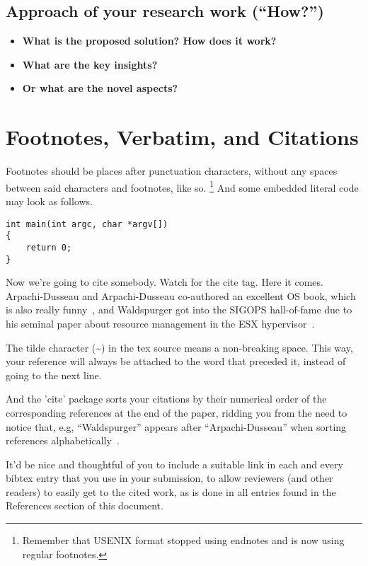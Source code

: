\subsection{Approach of your research work (``How?'')}
\begin{itemize}
  \item \textbf{What is the proposed solution? How does it work?}
  \item \textbf{What are the key insights?}
  \item \textbf{Or what are the novel aspects?}
\end{itemize}

\section{Footnotes, Verbatim, and Citations}

Footnotes should be places after punctuation characters, without any
spaces between said characters and footnotes, like so.%
\footnote{Remember that USENIX format stopped using endnotes and is
  now using regular footnotes.} And some embedded literal code may
look as follows.

\begin{verbatim}
int main(int argc, char *argv[]) 
{
    return 0;
}
\end{verbatim}

Now we're going to cite somebody. Watch for the cite tag. Here it
comes. Arpachi-Dusseau and Arpachi-Dusseau co-authored an excellent OS
book, which is also really funny~\cite{arpachiDusseau18:osbook}, and
Waldspurger got into the SIGOPS hall-of-fame due to his seminal paper
about resource management in the ESX hypervisor~\cite{waldspurger02}.

The tilde character (\~{}) in the tex source means a non-breaking
space. This way, your reference will always be attached to the word
that preceded it, instead of going to the next line.

And the 'cite' package sorts your citations by their numerical order
of the corresponding references at the end of the paper, ridding you
from the need to notice that, e.g, ``Waldspurger'' appears after
``Arpachi-Dusseau'' when sorting references
alphabetically~\cite{waldspurger02,arpachiDusseau18:osbook}. 

It'd be nice and thoughtful of you to include a suitable link in each
and every bibtex entry that you use in your submission, to allow
reviewers (and other readers) to easily get to the cited work, as is
done in all entries found in the References section of this document.

